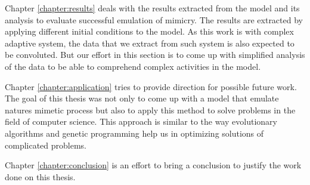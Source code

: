 Chapter \ref{chapter:results} deals with the results extracted from the model and its analysis to evaluate successful emulation of mimicry. The results are extracted by applying different initial conditions to the model. As this work is with complex adaptive system, the data that we extract from such system is also expected to be convoluted. But our effort in this section is to come up with simplified analysis of the data to be able to comprehend complex activities in the model. 

Chapter \ref{chapter:application} tries to provide direction for possible future work. The goal of this thesis was not only to come up with a model that emulate natures mimetic process but also to apply this method to solve problems in the field of computer science. This approach is similar to the way evolutionary algorithms and genetic programming help us in optimizing solutions of complicated problems. 

Chapter \ref{chapter:conclusion} is an effort to bring a conclusion to justify the work done on this thesis. 
